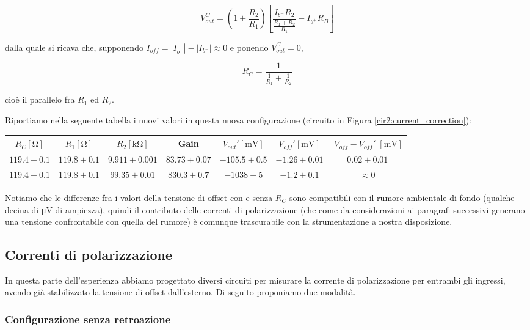 \begin{equation}
V_{out}^{C} = \left( 1+\frac{R_2}{R_1} \right)\left[ \frac{I_{b^-}R_2}{\frac{R_1+R_2}{R_1}} - I_{b^+} R_B\right]
\label{eq2:Vout_currents}
\end{equation}

dalla quale si ricava che, supponendo $I_{off} = |I_{b^+}|-|I_{b^-}| \approx 0$ e ponendo $V_{out}^{C}=0$,

$$R_C=\frac{1}{\frac{1}{R_1} + \frac{1}{R_2}} $$

cioè il parallelo fra $R_1$ ed $R_2$.

Riportiamo nella seguente tabella i nuovi valori in questa nuova configurazione (circuito in Figura \ref{cir2:current_correction}):

\begin{center}
\begin{tabular}{c|c|c|c|c|c|c}
$R_C [\si{\ohm}]$& $R_1[\si{\ohm}]$ & $R_2[\si{\kilo\ohm}]$ & Gain & $V_{out}' [\si{\milli\volt}]$ & $V_{off}' [\si{\milli\volt}]$ & $|V_{off}-V_{off}'|[\si{\milli\volt}]$ \\ 
\hline 
$119.4\pm0.1$ & $119.8\pm0.1$ & $9.911\pm0.001$  & $83.73 \pm 0.07$ & $-105.5 \pm 0.5$ & $-1.26 \pm0.01$ & $0.02\pm0.01$ \\
\hline
$119.4\pm0.1$ & $119.8\pm0.1$ & $99.35\pm0.01$  & $830.3\pm0.7$ &$ -1038 \pm 5$ & $-1.2 \pm 0.1$ & $\approx 0$\\
\end{tabular}
\end{center}

Notiamo che le differenze fra i valori della tensione di offset con e senza $R_C$ sono compatibili con il rumore ambientale di fondo (qualche decina di \si{\micro\volt} di ampiezza), quindi il contributo delle correnti di polarizzazione (che come da considerazioni ai paragrafi successivi generano una tensione confrontabile con quella del rumore) è comunque trascurabile con la strumentazione a nostra disposizione.

\subsection{Correnti di polarizzazione}

In questa parte dell'esperienza abbiamo progettato diversi circuiti per misurare la corrente di polarizzazione per entrambi gli ingressi, avendo già stabilizzato la tensione di offset dall'esterno. Di seguito proponiamo due modalità.

\subsubsection{Configurazione senza retroazione}


